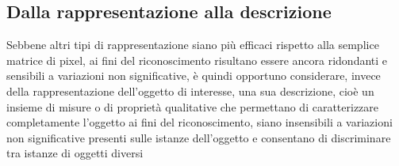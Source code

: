 \subsection{Dalla rappresentazione alla descrizione} Sebbene altri tipi di
rappresentazione siano più  efficaci rispetto alla semplice matrice di pixel,
ai  fini del riconoscimento risultano essere ancora  ridondanti e sensibili a
variazioni non  significative, è quindi opportuno considerare, invece della
rappresentazione dell’oggetto di interesse,  una sua descrizione, cioè  un
insieme di misure o di proprietà qualitative  che permettano di caratterizzare
completamente  l’oggetto ai fini del riconoscimento, siano insensibili a
variazioni non significative presenti  sulle istanze dell’oggetto e consentano
di discriminare tra istanze di oggetti  diversi
